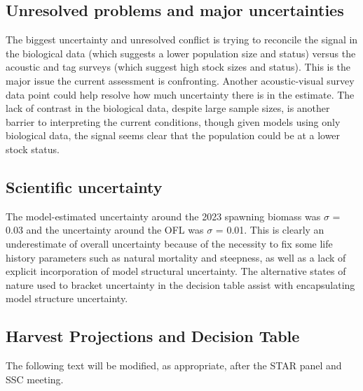 \documentclass[11pt,
  english,
  letterpaper,
]{article}
\begin{document}
\hypertarget{unresolved-problems-and-major-uncertainties}{%
\subsection*{Unresolved problems and major uncertainties}\label{unresolved-problems-and-major-uncertainties}}

The biggest uncertainty and unresolved conflict is trying to reconcile the signal in the biological data (which suggests a lower population size and status) versus the acoustic and tag surveys (which suggest high stock sizes and status). This is the major issue the current assessment is confronting. Another acoustic-visual survey data point could help resolve how much uncertainty there is in the estimate. The lack of contrast in the biological data, despite large sample sizes, is another barrier to interpreting the current conditions, though given models using only biological data, the signal seems clear that the population could be at a lower stock status.

\hypertarget{scientific-uncertainty}{%
\subsection*{Scientific uncertainty}\label{scientific-uncertainty}}

The model-estimated uncertainty around the 2023 spawning biomass was \(\sigma\) = 0.03 and the uncertainty around the OFL was \(\sigma\) = 0.01. This is clearly an underestimate of overall uncertainty because of the necessity to fix some life history parameters such as natural mortality and steepness, as well as a lack of explicit incorporation of model structural uncertainty. The alternative states of nature used to bracket uncertainty in the decision table assist with encapsulating model structure uncertainty.

\hypertarget{harvest-projections-and-decision-table}{%
\subsection*{Harvest Projections and Decision Table}\label{harvest-projections-and-decision-table}}

The following text will be modified, as appropriate, after the STAR panel and SSC meeting.
\end{document}
